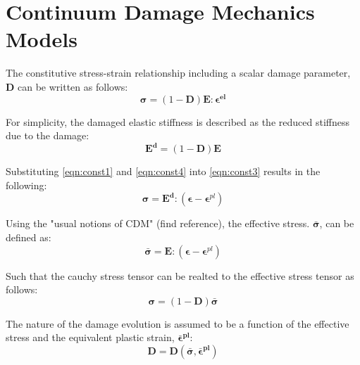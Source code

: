 \section{Continuum Damage Mechanics Models}
The constitutive stress-strain relationship including a scalar damage parameter, $\mathbf{D}$ can be written as follows:
\begin{equation}
\label{eqn:const3}
\boldsymbol{\sigma} = (1-\mathbf{D})\mathbf{E}:\boldsymbol{\epsilon^{el}}
\end{equation}

For simplicity, the damaged elastic stiffness is described as the reduced stiffness due to the damage:
\begin{equation}
\label{eqn:const4}
\mathbf{E^d} = (1-\mathbf{D})\mathbf{E}
\end{equation}

Substituting \ref{eqn:const1} and \ref{eqn:const4} into \ref{eqn:const3} results in the following:
\begin{equation}
\label{eqn:const5}
\boldsymbol{\sigma} = \mathbf{E^d}:(\boldsymbol{\epsilon}-\boldsymbol{\epsilon}^{pl})
\end{equation}

Using the "usual notions of CDM" (find reference), the effective stress. $\boldsymbol{\bar{\sigma}}$, can be defined as:
\begin{equation}
\label{eqn:const6}
\boldsymbol{\bar{\sigma}} = \mathbf{E}:(\boldsymbol{\epsilon}-\boldsymbol{\epsilon}^{pl})
\end{equation}

Such that the cauchy stress tensor can be realted to the effective stress tensor as follows:
\begin{equation}
\label{eqn:const7}
\boldsymbol{\sigma} = (1-\mathbf{D})\boldsymbol{\bar{\sigma}}
\end{equation}

The nature of the damage evolution is assumed to be a function of the effective stress and the equivalent plastic strain, $\boldsymbol{\bar{\epsilon}^{pl}}$:
\begin{equation}
\label{eqn:const8}
\mathbf{D} = \mathbf{D}(\boldsymbol{\bar{\sigma}}, \boldsymbol{\bar{\epsilon}^{pl}})
\end{equation}